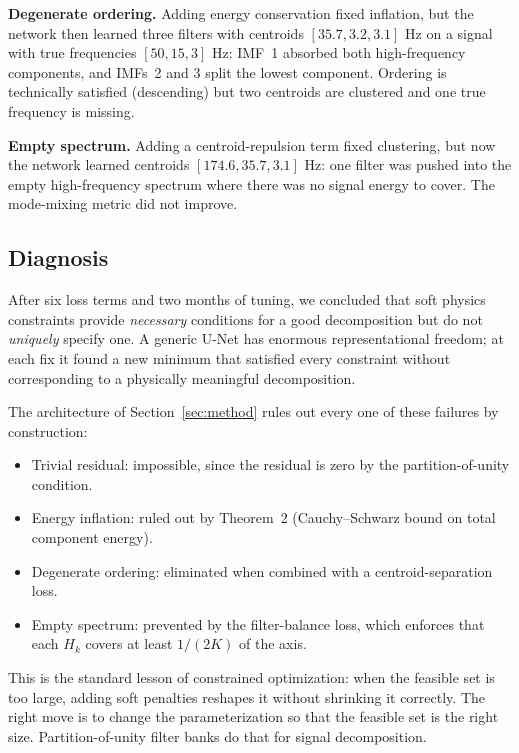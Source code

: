 \documentclass[journal]{IEEEtran}
\begin{document}
\textbf{Degenerate ordering.} Adding energy conservation fixed inflation, but the network then learned three filters with centroids $[35.7, 3.2, 3.1]$ Hz on a signal with true frequencies $[50, 15, 3]$ Hz: IMF~1 absorbed both high-frequency components, and IMFs~2 and 3 split the lowest component. Ordering is technically satisfied (descending) but two centroids are clustered and one true frequency is missing.

\textbf{Empty spectrum.} Adding a centroid-repulsion term fixed clustering, but now the network learned centroids $[174.6, 35.7, 3.1]$ Hz: one filter was pushed into the empty high-frequency spectrum where there was no signal energy to cover. The mode-mixing metric did not improve.

\subsection{Diagnosis}

After six loss terms and two months of tuning, we concluded that soft physics constraints provide \emph{necessary} conditions for a good decomposition but do not \emph{uniquely} specify one. A generic U-Net has enormous representational freedom; at each fix it found a new minimum that satisfied every constraint without corresponding to a physically meaningful decomposition.

The architecture of Section~\ref{sec:method} rules out every one of these failures by construction:
\begin{itemize}
\item Trivial residual: impossible, since the residual is zero by the partition-of-unity condition.
\item Energy inflation: ruled out by Theorem~2 (Cauchy--Schwarz bound on total component energy).
\item Degenerate ordering: eliminated when combined with a centroid-separation loss.
\item Empty spectrum: prevented by the filter-balance loss, which enforces that each $H_{k}$ covers at least $1/(2K)$ of the axis.
\end{itemize}

This is the standard lesson of constrained optimization: when the feasible set is too large, adding soft penalties reshapes it without shrinking it correctly. The right move is to change the parameterization so that the feasible set is the right size. Partition-of-unity filter banks do that for signal decomposition.
\end{document}
